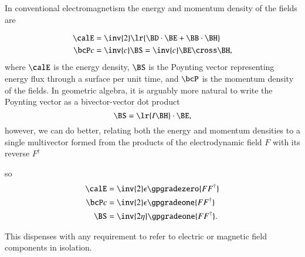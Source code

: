 %
%

In conventional electromagnetism the energy and momentum density of the fields are

\begin{dmath}\label{eqn:poyntingF:20}
\begin{aligned}
\calE &= \inv{2} \lr{ \BD \cdot \BE + \BB \cdot \BH } \\
\bcP c &= \inv{c} \BS = \inv{c} \BE \cross \BH,
\end{aligned}
\end{dmath}
where \( \calE \) is the energy density, \( \BS \) is the Poynting vector representing energy flux through a surface per unit time, and \( \bcP \) is the momentum density of the fields.
In geometric algebra, it is arguably more natural to write the Poynting vector as a bivector-vector dot product
\begin{dmath}\label{eqn:poyntingF:1100}
\BS = \lr{ I \BH } \cdot \BE,
\end{dmath}
however, we can do better, relating both the
energy and momentum densities to a single multivector formed from the products of the electrodynamic field \( F \) with its reverse \( F^\dagger \)

so
\begin{dmath}\label{eqn:poyntingF:40}
\begin{aligned}
\calE &= \inv{2} \epsilon \gpgradezero{ F F^\dagger } \\
\bcP c &= \inv{2} \epsilon \gpgradeone{ F F^\dagger } \\
\BS &= \inv{2 \eta} \gpgradeone{ F F^\dagger }.
\end{aligned}
\end{dmath}

This dispenses with any requirement to refer to electric or magnetic field components in isolation.

